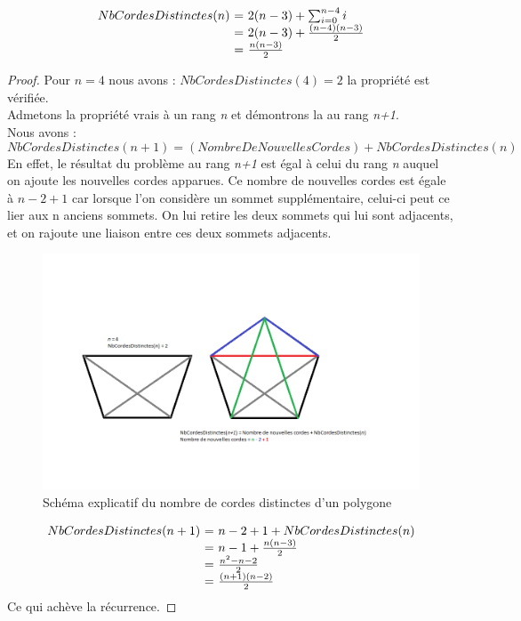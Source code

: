 \documentclass[a4paper,10pt]{article}
\begin{document}
\begin{equation} 
\begin{array}{r @{=} l}
NbCordesDistinctes(n) \ & \ 2(n-3) + \sum_{i=0}^{n-4} i \\
		      & \ 2(n-3) + \frac{(n-4)(n-3)}{2} \\
		      & \ \frac{n(n-3)}{2}
\end{array} 
\end{equation}


\begin{proof}
Pour \(n = 4\) nous avons : \(NbCordesDistinctes(4)=2 \) la propriété est vérifiée. \\
Admetons la propriété vrais à un rang \emph{n} et démontrons la au rang \emph{n+1}. \\
Nous avons :\\
\[NbCordesDistinctes(n+1) = (NombreDeNouvellesCordes) + NbCordesDistinctes(n)\]
En effet, le résultat du problème au rang \emph{n+1} est égal à celui du rang \emph{n} auquel on ajoute les nouvelles cordes apparues.
Ce nombre de nouvelles cordes est égale à \(n - 2 + 1 \) car lorsque l'on considère un sommet supplémentaire, celui-ci peut ce lier aux n anciens sommets.
On lui retire les deux sommets qui lui sont adjacents, et on rajoute une liaison entre ces deux sommets adjacents.

\begin{figure}[h!]
\begin{center}
\includegraphics[scale=1]{dem1.png}
\caption{Schéma explicatif du nombre de cordes distinctes d'un polygone}
\end{center}
\end{figure}

\[
\begin{array}{r @{=} l}
NbCordesDistinctes(n+1) \ & \ n -  2 + 1 + NbCordesDistinctes(n) \\
			  & \ n - 1 + \frac{n(n-3)}{2} \\
			  & \ \frac{{n^2}-n-2}{2} \\
			  & \ \frac{(n+1)(n-2)}{2} \\
\end{array}
\]
Ce qui achève la récurrence.	
\end{proof}
\end{document}
